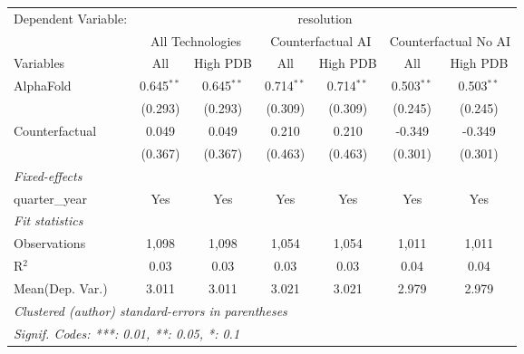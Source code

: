 \begingroup
\centering
\begin{tabular}{lcccccc}
   \tabularnewline \midrule \midrule
   Dependent Variable: & \multicolumn{6}{c}{resolution}\\
 & \multicolumn{2}{c}{All Technologies} & \multicolumn{2}{c}{Counterfactual AI} & \multicolumn{2}{c}{Counterfactual No AI} \\
\cmidrule(lr){1-1}\cmidrule(lr){2-3} \cmidrule(lr){4-5} \cmidrule(lr){6-7}
Variables & \multicolumn{1}{c}{All} & \multicolumn{1}{c}{High PDB} & \multicolumn{1}{c}{All} & \multicolumn{1}{c}{High PDB} & \multicolumn{1}{c}{All} & \multicolumn{1}{c}{High PDB} \\
\cmidrule(lr){1-1}\cmidrule(lr){2-2} \cmidrule(lr){3-3} \cmidrule(lr){4-4} \cmidrule(lr){5-5} \cmidrule(lr){6-6} \cmidrule(lr){7-7}
   AlphaFold      & 0.645$^{**}$ & 0.645$^{**}$ & 0.714$^{**}$ & 0.714$^{**}$ & 0.503$^{**}$ & 0.503$^{**}$\\   
                  & (0.293)      & (0.293)      & (0.309)      & (0.309)      & (0.245)      & (0.245)\\   
   Counterfactual & 0.049        & 0.049        & 0.210        & 0.210        & -0.349       & -0.349\\   
                  & (0.367)      & (0.367)      & (0.463)      & (0.463)      & (0.301)      & (0.301)\\   
   \midrule
   \emph{Fixed-effects}\\
   quarter\_year  & Yes          & Yes          & Yes          & Yes          & Yes          & Yes\\  
   \midrule
   \emph{Fit statistics}\\
   Observations   & 1,098        & 1,098        & 1,054        & 1,054        & 1,011        & 1,011\\  
   R$^2$          & 0.03         & 0.03         & 0.03         & 0.03         & 0.04         & 0.04\\  
Mean(Dep. Var.) & 3.011 & 3.011 & 3.021 & 3.021 & 2.979 & 2.979 \\
   \midrule \midrule
   \multicolumn{7}{l}{\emph{Clustered (author) standard-errors in parentheses}}\\
   \multicolumn{7}{l}{\emph{Signif. Codes: ***: 0.01, **: 0.05, *: 0.1}}\\
\end{tabular}
\par\endgroup
